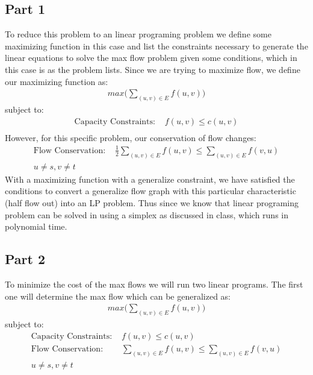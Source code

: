 \documentclass[11pt]{article}
\begin{document}
\subsection*{Part 1}
 To reduce this problem to an linear programing problem we define some maximizing function in this case and list the constraints necessary to generate the linear equations to solve the max flow problem given some conditions, which in this case is as the problem lists. Since we are trying to maximize flow, we define our maximizing function as:\\
\begin{align*}
max \bigg( \sum_{(u,v) \in E}^{} f(u,v) \bigg)
\end{align*}
subject to:
\begin{align*}
\text{Capacity Constraints: }&f(u,v) \leq c(u,v)\\
\end{align*}
However, for this specific problem, our conservation of flow changes:
\begin{align*}
\text{Flow Conservation: }&\frac{1}{2}\sum_{(u,v) \in E}^{} f(u,v) \leq \sum_{(u,v)\in E}^{} f(v,u) \\
u\not= s, v\not=t
\end{align*}
With a maximizing function with a generalize constraint, we have satisfied the conditions to convert a generalize flow graph with this particular characteristic (half flow out) into an LP problem. Thus since we know that linear programing problem can be solved in using a simplex as discussed in class, which runs in polynomial time.

\subsection*{Part 2}
To minimize the cost of the max flows we will run two linear programs. The first one will determine the max flow which can be generalized as:\\
\begin{align*}
max \bigg( \sum_{(u,v) \in E}^{} f(u,v) \bigg)
\end{align*}
subject to:
\begin{align*}
\text{Capacity Constraints: }&f(u,v) \leq c(u,v)\\
\text{Flow Conservation: }&\sum_{(u,v) \in E}^{} f(u,v) \leq \sum_{(u,v)\in E}^{} f(v,u) \\
u\not= s, v\not=t
\end{align*}
\end{document}

